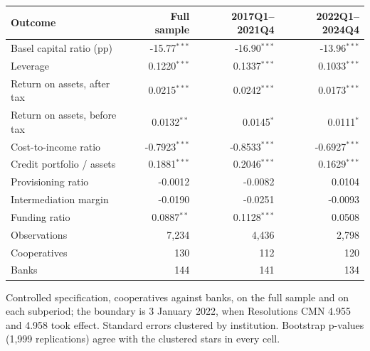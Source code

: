 \begin{tabular}{lrrr}
\toprule
Outcome & Full sample & 2017Q1--2021Q4 & 2022Q1--2024Q4 \\
\midrule
Basel capital ratio (pp) & -15.77$^{***}$ & -16.90$^{***}$ & -13.96$^{***}$ \\
Leverage & 0.1220$^{***}$ & 0.1337$^{***}$ & 0.1033$^{***}$ \\
Return on assets, after tax & 0.0215$^{***}$ & 0.0242$^{***}$ & 0.0173$^{***}$ \\
Return on assets, before tax & 0.0132$^{**}$ & 0.0145$^{*}$ & 0.0111$^{*}$ \\
Cost-to-income ratio & -0.7923$^{***}$ & -0.8533$^{***}$ & -0.6927$^{***}$ \\
Credit portfolio / assets & 0.1881$^{***}$ & 0.2046$^{***}$ & 0.1629$^{***}$ \\
Provisioning ratio & -0.0012 & -0.0082 & 0.0104 \\
Intermediation margin & -0.0190 & -0.0251 & -0.0093 \\
Funding ratio & 0.0887$^{**}$ & 0.1128$^{***}$ & 0.0508 \\
\midrule
Observations & 7,234 & 4,436 & 2,798 \\
Cooperatives & 130 & 112 & 120 \\
Banks & 144 & 141 & 134 \\
\bottomrule
\end{tabular}
\begin{tablenotes}[flushleft]\footnotesize
\item Controlled specification, cooperatives against banks, on the full sample and on each subperiod; the boundary is 3 January 2022, when Resolutions CMN 4.955 and 4.958 took effect. Standard errors clustered by institution. Bootstrap p-values (1,999 replications) agree with the clustered stars in every cell.
\end{tablenotes}
